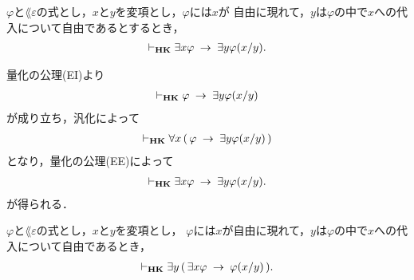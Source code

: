 	\begin{screen}
		\begin{thm}
			$\varphi$と$\lang{\varepsilon}$の式とし，$x$と$y$を変項とし，$\varphi$には$x$が
			自由に現れて，$y$は$\varphi$の中で$x$への代入について自由であるとするとき，
			\begin{align}
				\vdash_{{\scriptsize \mbox{{\bf HK}}}} \exists x \varphi \hspace{0.25em}\rightarrow\hspace{0.25em} \exists y \varphi(x/y).
			\end{align}
		\end{thm}
	\end{screen}
	
	\begin{sketch}
		量化の公理(EI)より
		\begin{align}
			\vdash_{{\scriptsize \mbox{{\bf HK}}}} \varphi \hspace{0.25em}\rightarrow\hspace{0.25em} \exists y \varphi(x/y)
		\end{align}
		が成り立ち，汎化によって
		\begin{align}
			\vdash_{{\scriptsize \mbox{{\bf HK}}}} \forall x\, (\, \varphi \hspace{0.25em}\rightarrow\hspace{0.25em} \exists y \varphi(x/y)\, )
		\end{align}
		となり，量化の公理(EE)によって
		\begin{align}
			\vdash_{{\scriptsize \mbox{{\bf HK}}}} \exists x \varphi \hspace{0.25em}\rightarrow\hspace{0.25em} \exists y \varphi(x/y).
		\end{align}
		が得られる．
		\QED
	\end{sketch}
	
	\begin{screen}
		\begin{thm}
			$\varphi$と$\lang{\varepsilon}$の式とし，$x$と$y$を変項とし，
			$\varphi$には$x$が自由に現れて，$y$は$\varphi$の中で$x$への代入について自由であるとき，
			\begin{align}
				\vdash_{{\scriptsize \mbox{{\bf HK}}}} \exists y\, (\, \exists x \varphi \hspace{0.25em}\rightarrow\hspace{0.25em} \varphi(x/y)\, ).
			\end{align}
		\end{thm}
	\end{screen}
	
